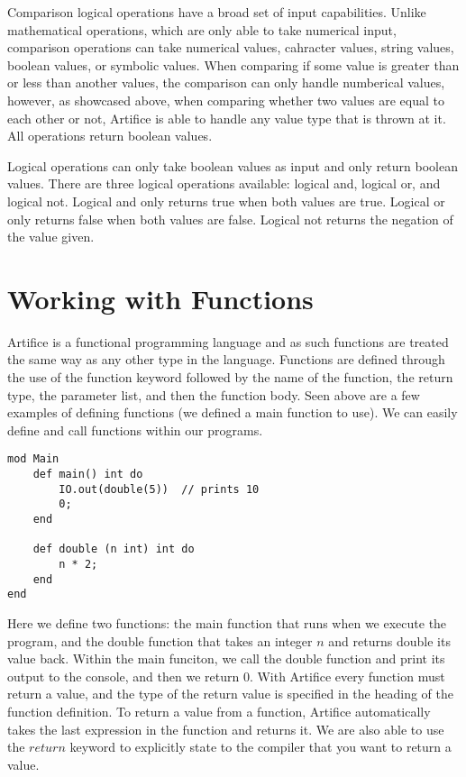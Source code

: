 \documentclass{article}
\begin{document}
Comparison logical operations have a broad set of input capabilities. Unlike mathematical operations, which are only able to take numerical input,
comparison operations can take numerical values, cahracter values, string values, boolean values, or symbolic values. When comparing if some value is
greater than or less than another values, the comparison can only handle numberical values, however, as showcased above, when comparing whether two
values are equal to each other or not, Artifice is able to handle any value type that is thrown at it. All operations return boolean values.

Logical operations can only take boolean values as input and only return boolean values. There are three logical operations available: logical and,
logical or, and logical not. Logical and only returns true when both values are true. Logical or only returns false when both values are false.
Logical not returns the negation of the value given.


\section{Working with Functions}

Artifice is a functional programming language and as such functions are treated the same way as any other type in the language. Functions are defined through
the use of the function keyword followed by the name of the function, the return type, the parameter list, and then the function body. Seen above are a few
examples of defining functions (we defined a main function to use). We can easily define and call functions within our programs.

\begin{lstlisting}
mod Main
	def main() int do
		IO.out(double(5))  // prints 10
		0;
	end

	def double (n int) int do
		n * 2;
	end
end
\end{lstlisting}

Here we define two functions: the main function that runs when we execute the program, and the double function that takes an integer $n$ and returns
double its value back. Within the main funciton, we call the double function and print its output to the console, and then we return $0$. With Artifice
every function must return a value, and the type of the return value is specified in the heading of the function definition. To return a value from
a function, Artifice automatically takes the last expression in the function and returns it. We are also able to use the $return$ keyword to explicitly
state to the compiler that you want to return a value.
\end{document}
